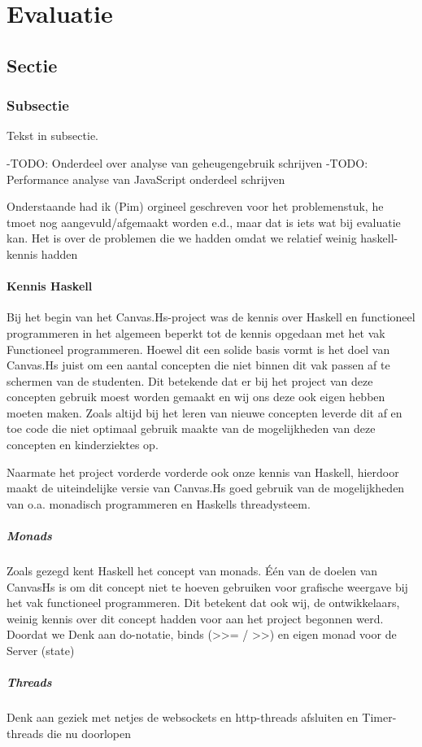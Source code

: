\chapter{Evaluatie} \label{hoofdstuk:evaluatie}
\section{Sectie}
\subsection{Subsectie}
Tekst in subsectie.



-TODO: Onderdeel over analyse van geheugengebruik schrijven
-TODO: Performance analyse van JavaScript onderdeel schrijven

{\color{red} Onderstaande had ik (Pim) orgineel geschreven voor het problemenstuk, he tmoet nog aangevuld/afgemaakt worden e.d., maar dat is iets wat bij evaluatie kan. Het is over de problemen die we hadden omdat we relatief weinig haskell-kennis hadden}

\subsubsection{Kennis Haskell}
Bij het begin van het Canvas.Hs-project was de kennis over Haskell en functioneel programmeren in het algemeen beperkt tot de kennis opgedaan met het vak Functioneel programmeren. Hoewel dit een solide basis vormt is het doel van Canvas.Hs juist om een aantal concepten die niet binnen dit vak passen af te schermen van de studenten. Dit betekende dat er bij het project van deze concepten gebruik moest worden gemaakt en wij ons deze ook eigen hebben moeten maken. Zoals altijd bij het leren van nieuwe concepten leverde dit af en toe code die niet optimaal gebruik maakte van de mogelijkheden van deze concepten en kinderziektes op. 

Naarmate het project vorderde vorderde ook onze kennis van Haskell, hierdoor maakt de uiteindelijke versie van Canvas.Hs goed gebruik van de mogelijkheden van o.a. monadisch programmeren en Haskells threadysteem. 

\paragraph{Monads}
Zoals gezegd kent Haskell het concept van monads. Één van de doelen van CanvasHs is om dit concept niet te hoeven gebruiken voor grafische weergave bij het vak functioneel programmeren. Dit betekent dat ook wij, de ontwikkelaars, weinig kennis over dit concept hadden voor aan het project begonnen werd. Doordat we 
Denk aan do-notatie, binds (>>= / >>) en eigen monad voor de Server (state)

\paragraph{Threads}
Denk aan geziek met netjes de websockets en http-threads afsluiten en Timer-threads die nu doorlopen
